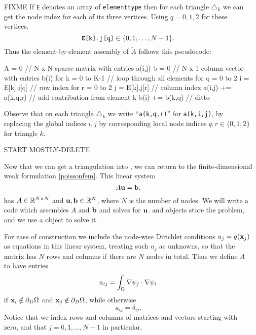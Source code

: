 FIXME If \texttt{E} denotes an array of \texttt{elementtype} then for each triangle $\triangle_k$ we can get the node index for each of its three vertices.  Using $q=0,1,2$ for these vertices,
    $$\text{\texttt{E[k].j[q]}} \in \{0,1,\dots,N-1\}.$$
Thus the element-by-element assembly of $\tilde A$ follows this pseudocode:
\begin{code}
A = 0                           // N x N sparse matrix with entries a(i,j)
b = 0                           // N x 1 column vector with entries b(i)
for k = 0 to K-1                // loop through all elements
    for q = 0 to 2
        i = E[k].j[q]           // row index
        for r = 0 to 2
            j = E[k].j[r]       // column index
            a(i,j) += a(k,q,r)  // add contribution from element k
            b(i)   += b(k,q)    // ditto
\end{code}
\medskip\noindent
Observe that on each triangle $\triangle_k$ we write ``\texttt{a(k,q,r)}'' for \texttt{a(k,i,j)}, by replacing the global indices $i,j$ by corresponding local node indices $q,r\in\{0,1,2\}$ for triangle $k$.


START MOSTLY-DELETE

Now that we can get a triangulation into \PETSc, we can return to the finite-dimensional weak formulation \eqref{poissonfem}.  This linear system
\begin{equation}
A \mathbf{u} = \mathbf{b}, \label{poissonmatrix}
\end{equation}
has $A\in\mathbb{R}^{N\times N}$ and $\mathbf{u},\mathbf{b}\in\mathbb{R}^N$, where $N$ is the number of nodes.  We will write a code which assembles $A$ and $\mathbf{b}$ and solves for $\mathbf{u}$.  \PETSc \pMat and \pVec objects store the problem, and we use a \pKSP object to solve it.

For ease of construction we include the node-wise Dirichlet conditions $u_j=g(\mathbf{x}_j)$ as equations in this linear system, treating such $u_j$ as unknowns, so that the matrix has $N$ rows and columns if there are $N$ nodes in total.  Thus we define $A$ to have entries
\begin{equation}
a_{ij} = \int_\Omega \nabla \psi_j \cdot \nabla \psi_i \label{Aentryfem}
\end{equation}
if $\mathbf{x}_i \notin \partial_D \Omega$ and $\mathbf{x}_j \notin \partial_D \Omega$, while otherwise
\begin{equation*}
a_{ij} = \delta_{ij}.
\end{equation*}
Notice that we index rows and columns of matrices and vectors starting with zero, and that $j=0,1,\dots,N-1$ in particular.

